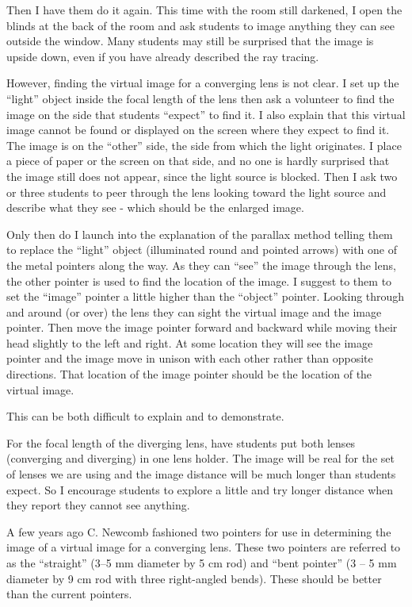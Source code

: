 Then I have them do it again. This time with the room still darkened, I open the blinds at the back of the room and ask students to image anything they can see outside the window. Many students may still be surprised that the image is upside down, even if you have already described the ray tracing.

However, finding the virtual image for a converging lens is not clear. I set up the ``light'' object inside the focal length of the lens then ask a volunteer to find the image on the side that students ``expect'' to find it. I also explain that this virtual image cannot be found or displayed on the screen where they expect to find  it. The image is on the ``other'' side, the side from which the light originates. I place a piece of paper or the screen on that side, and no one is hardly surprised that the image still does not appear, since the light source is blocked. Then I ask two or three students to peer through the lens looking toward the light source and describe what they see - which should be the enlarged image.

Only then do I launch into the explanation of the parallax method telling them to replace the ``light'' object (illuminated round and pointed arrows) with one of the metal pointers along the way. As they can ``see'' the image through the lens, the other pointer is used to find the location of the image. I suggest to them to set the ``image'' pointer a little higher than the ``object'' pointer. Looking through and around (or over) the lens they can sight the virtual image and the image pointer. Then move the image pointer forward and backward while moving their head slightly to the left and right. At some location they will see the image pointer and the image move in unison with each other rather than opposite directions. That location of the image pointer should be the location of the virtual image.

This can be both difficult to explain and to demonstrate. %

For the focal length of the diverging lens, have students put both lenses (converging and diverging) in one lens holder. The image will be real for the set of lenses we are using and the image distance will be much longer than students expect. So I encourage students to explore a little and try longer distance when they report they cannot see anything.


A few years ago C. Newcomb fashioned two pointers for use in determining the image of a virtual image for a converging lens. These two pointers are referred to as the ``straight'' (3--5 mm diameter by 5 cm rod) and ``bent pointer'' (3 -- 5 mm diameter by 9 cm rod with three right-angled bends). These should be better than the current pointers.

